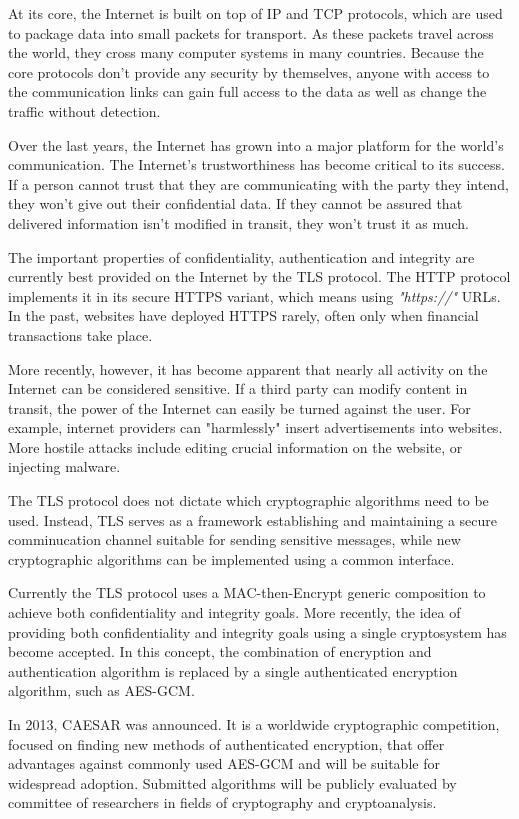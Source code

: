 \begin{introduction}

At its core, the Internet is built on top of IP and TCP protocols, which are used to package data into small packets for transport. As these packets travel across the world, they cross many computer systems in many countries. Because the core protocols don't provide any security by themselves, anyone with access to the communication links can gain full access to the data as well as change the traffic without detection.

Over the last years, the Internet has grown into a major platform for the world's communication. The Internet's trustworthiness has become critical to its success. If a person cannot trust that they are communicating with the party they intend, they won't give out their confidential data. If they cannot be assured that delivered information isn't modified in transit, they won't trust it as much.

The important properties of confidentiality, authentication and integrity are currently best provided on the Internet by the TLS protocol. The HTTP protocol implements it in its secure HTTPS variant, which means using \textit{"https://"} URLs. In the past, websites have deployed HTTPS rarely, often only when financial transactions take place.

More recently, however, it has become apparent that nearly all activity on the Internet can be considered sensitive. If a third party can modify content in transit, the power of the Internet can easily be turned against the user. For example, internet providers can "harmlessly" insert advertisements into websites. More hostile attacks include editing crucial information on the website, or injecting malware.

The TLS protocol does not dictate which cryptographic algorithms need to be used. Instead, TLS serves as a framework establishing and maintaining a secure comminucation channel suitable for sending sensitive messages, while new cryptographic algorithms can be implemented using a common interface.

Currently the TLS protocol uses a MAC-then-Encrypt generic composition to achieve both confidentiality and integrity goals. More recently, the idea of providing both confidentiality and integrity goals using a single cryptosystem has become accepted. In this concept, the combination of encryption and authentication algorithm is replaced by a single authenticated encryption algorithm, such as AES-GCM.

In 2013, CAESAR was announced. It is a worldwide cryptographic competition, focused on finding new methods of authenticated encryption, that offer advantages against commonly used AES-GCM and will be suitable for widespread adoption. Submitted algorithms will be publicly evaluated by committee of researchers in fields of cryptography and cryptoanalysis.



\end{introduction}
